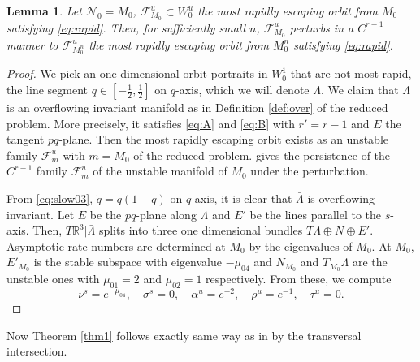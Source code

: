 \documentclass[a4paper,11pt]{article}
\newtheorem{lemma}{Lemma}[section]
\theoremstyle{remark}
\begin{document}
\begin{lemma} \label{lem:rapid}
 Let $\mathcal{N}_0=M_0$, $\mathcal{F}^u_{M_0}\subset W_0^u$ the most rapidly escaping orbit from $M_0$ satisfying \eqref{eq:rapid}. Then, for sufficiently small $n$, $\mathcal{F}^u_{M_0}$ perturbs in a $C^{r-1}$ manner to $\mathcal{F}^u_{M_0^n}$ the most rapidly escaping orbit from $M_0^n$ satisfying \eqref{eq:rapid}. 
\end{lemma}
\begin{proof}
 We pick an one dimensional orbit portraits in $W_0^1$ that are not most rapid, the line segment $q\in [- \frac{1}{2}, \frac{1}{2}]$ on $q$-axis, which we will denote $\bar{\Lambda}$. We claim that $\bar\Lambda$ is an overflowing invariant manifold as in Definition \ref{def:over} of the reduced problem. More precisely, it satisfies \eqref{eq:A} and \eqref{eq:B} with $r'=r-1$ and $E$ the tangent $pq$-plane. Then the most rapidly escaping orbit exists as an unstable family $\mathcal{F}^u_m$ with $m=M_0$ of the reduced problem. \cite[Theorem 3]{fenichel_asymptotic_1977} gives the persistence of the $C^{r-1}$ family $\mathcal{F}^u_m$ of the unstable manifold of $M_0$ under the perturbation.
 
 From \eqref{eq:slow03}, $\dot{q}=q(1-q)$ on $q$-axis, it is clear that $\bar\Lambda$ is overflowing invariant. Let $E$ be the $pq$-plane along $\bar{\Lambda}$ and $E'$ be the lines parallel to the $s$-axis. Then, $T \mathbb{R}^3|\bar\Lambda$ splits into three one dimensional bundles $T\Lambda\oplus N \oplus E'$.  %
 Asymptotic rate numbers are determined at $M_0$ by the eigenvalues of $M_0$. At $M_0$, $E'_{M_0}$ is the stable subspace with eigenvalue $-\mu_{04}$ and $N_{M_0}$ and $T_{M_0}\Lambda$ are the unstable ones with $\mu_{01}=2$ and $\mu_{02}=1$ respectively. From these, we compute 
 $$ \nu^s = e^{-\mu_{04}}, \quad\sigma^s = 0, \quad\alpha^u = e^{-2}, \quad\rho^u=e^{-1}, \quad\tau^u=0.$$
\end{proof}

Now Theorem \ref{thm1} follows exactly same way as in \cite[Theorem 3.1]{Sz1991} by the transversal intersection.
\end{document}
